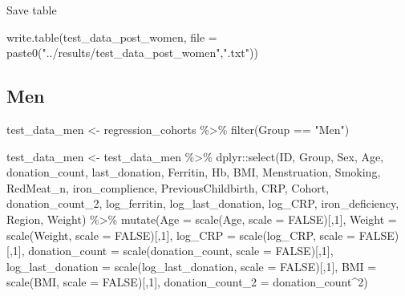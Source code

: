 \documentclass[
]{article}
\newenvironment{Shaded}{\begin{snugshade}}{\end{snugshade}}
\newcommand{\AttributeTok}[1]{\textcolor[rgb]{0.77,0.63,0.00}{#1}}
\newcommand{\ConstantTok}[1]{\textcolor[rgb]{0.00,0.00,0.00}{#1}}
\newcommand{\DecValTok}[1]{\textcolor[rgb]{0.00,0.00,0.81}{#1}}
\newcommand{\FunctionTok}[1]{\textcolor[rgb]{0.00,0.00,0.00}{#1}}
\newcommand{\NormalTok}[1]{#1}
\newcommand{\OtherTok}[1]{\textcolor[rgb]{0.56,0.35,0.01}{#1}}
\newcommand{\SpecialCharTok}[1]{\textcolor[rgb]{0.00,0.00,0.00}{#1}}
\newcommand{\StringTok}[1]{\textcolor[rgb]{0.31,0.60,0.02}{#1}}
\begin{document}
Save table

\begin{Shaded}
\begin{Highlighting}[]
\FunctionTok{write.table}\NormalTok{(test\_data\_post\_women, }\AttributeTok{file =} \FunctionTok{paste0}\NormalTok{(}\StringTok{"../results/test\_data\_post\_women"}\NormalTok{,}\StringTok{".txt"}\NormalTok{))}
\end{Highlighting}
\end{Shaded}

\hypertarget{men}{%
\subsection{Men}\label{men}}

\begin{Shaded}
\begin{Highlighting}[]
\NormalTok{test\_data\_men }\OtherTok{\textless{}{-}}\NormalTok{ regression\_cohorts }\SpecialCharTok{\%\textgreater{}\%} 
  \FunctionTok{filter}\NormalTok{(Group }\SpecialCharTok{==} \StringTok{"Men"}\NormalTok{) }

\NormalTok{test\_data\_men }\OtherTok{\textless{}{-}}\NormalTok{ test\_data\_men }\SpecialCharTok{\%\textgreater{}\%} 
\NormalTok{  dplyr}\SpecialCharTok{::}\FunctionTok{select}\NormalTok{(ID, Group, Sex, Age, donation\_count, last\_donation, Ferritin, Hb, BMI, Menstruation, Smoking, RedMeat\_n, iron\_complience, PreviousChildbirth, CRP, Cohort, donation\_count\_2, log\_ferritin, log\_last\_donation, log\_CRP, iron\_deficiency, Region, Weight) }\SpecialCharTok{\%\textgreater{}\%}
  \FunctionTok{mutate}\NormalTok{(}\AttributeTok{Age =} \FunctionTok{scale}\NormalTok{(Age, }\AttributeTok{scale =} \ConstantTok{FALSE}\NormalTok{)[,}\DecValTok{1}\NormalTok{],}
         \AttributeTok{Weight =} \FunctionTok{scale}\NormalTok{(Weight, }\AttributeTok{scale =} \ConstantTok{FALSE}\NormalTok{)[,}\DecValTok{1}\NormalTok{],}
         \AttributeTok{log\_CRP =} \FunctionTok{scale}\NormalTok{(log\_CRP, }\AttributeTok{scale =} \ConstantTok{FALSE}\NormalTok{)[,}\DecValTok{1}\NormalTok{],}
         \AttributeTok{donation\_count =} \FunctionTok{scale}\NormalTok{(donation\_count, }\AttributeTok{scale =} \ConstantTok{FALSE}\NormalTok{)[,}\DecValTok{1}\NormalTok{],}
         \AttributeTok{log\_last\_donation =} \FunctionTok{scale}\NormalTok{(log\_last\_donation, }\AttributeTok{scale =} \ConstantTok{FALSE}\NormalTok{)[,}\DecValTok{1}\NormalTok{],}
         \AttributeTok{BMI =} \FunctionTok{scale}\NormalTok{(BMI, }\AttributeTok{scale =} \ConstantTok{FALSE}\NormalTok{)[,}\DecValTok{1}\NormalTok{],}
         \AttributeTok{donation\_count\_2 =}\NormalTok{ donation\_count}\SpecialCharTok{\^{}}\DecValTok{2}\NormalTok{) }
\end{Highlighting}
\end{Shaded}
\end{document}
